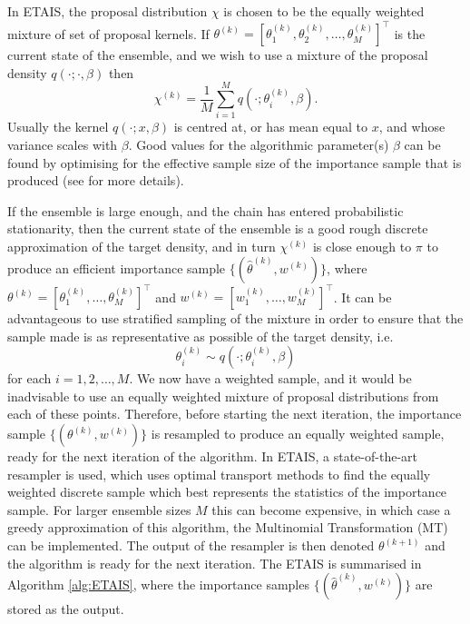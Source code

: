 \documentclass[final]{siamltex}
\begin{document}
In ETAIS, the proposal distribution $\chi$ is chosen to be the equally
weighted mixture of set of proposal kernels. If $\theta^{(k)} = [\theta_1^{(k)},
\theta_2^{(k)}, \ldots, \theta_M^{(k)}]^\top$ is the current state of the
ensemble, and we wish to use a mixture of the proposal density $q(\cdot ;
\cdot, \beta)$ then 
\[\chi^{(k)} = \frac{1}{M} \sum_{i=1}^M q(\cdot ; \theta_i^{(k)},
\beta).\]
Usually the kernel $q(\cdot ;
x,\beta)$ is centred at, or has mean equal to $x$, and whose variance
scales with $\beta$. Good values for the
algorithmic parameter(s) $\beta$ can be
found by optimising for the effective sample size of the importance
sample that is produced (see \cite{cotter2015parallel, russ2017parallel} for more details).

If the ensemble is large enough, and the chain has entered
probabilistic stationarity, then the current state of the ensemble is
a good rough discrete approximation of the target density, and in turn
$\chi^{(k)}$ is close enough to $\pi$ to produce an efficient importance
sample $\{(\hat{\theta}^{(k)},w^{(k)})\}$,  where $\theta^{(k)} =
[\theta_1^{(k)}, \ldots, \theta_M^{(k)}]^\top$ and $w^{(k)} =
[w_1^{(k)}, \ldots, w_M^{(k)}]^\top$. It can be advantageous to use stratified sampling of the
mixture in order to
ensure that the sample made is as representative as possible of the
target density, i.e.
\[ \theta_i^{(k)} \sim q(\cdot ; \theta_i^{(k)},\beta)\]
for each $i = 1,2,\ldots,M$.  We now have a weighted sample, and it
would be inadvisable to use an equally weighted mixture of proposal
distributions from each of these points. Therefore, before starting
the next iteration, the importance sample
$\{(\theta^{(k)},w^{(k)})\}$ is resampled to produce an equally
weighted sample, ready for the next iteration of the algorithm. In
ETAIS, a state-of-the-art resampler is used, which uses optimal
transport methods to find the equally weighted discrete sample which
best represents the statistics of the importance
sample\cite{reich2013nonparametric}. For larger ensemble sizes $M$ this can become
expensive, in which case a greedy approximation of this algorithm, the
Multinomial Transformation (MT) can be
implemented\cite{cotter2015parallel}. The output of the resampler is then denoted
$\theta^{(k+1)}$ and the algorithm is ready for the next
iteration. The ETAIS is summarised in Algorithm \ref{alg:ETAIS}, where
the importance samples $\{(\hat{\theta}^{(k)},w^{(k)})\}$ are stored as
the output.
\end{document}
